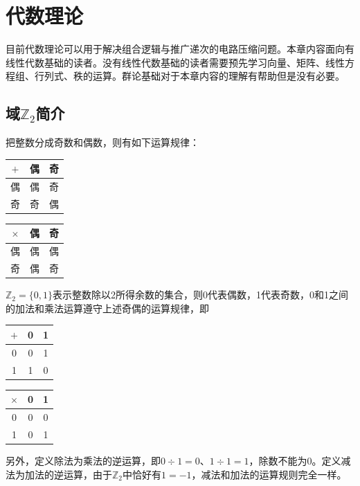 \chapter{代数理论}

目前代数理论可以用于解决组合逻辑与推广递次的电路压缩问题。本章内容面向有线性代数基础的读者。没有线性代数基础的读者需要预先学习向量、矩阵、线性方程组、行列式、秩的运算。群论基础对于本章内容的理解有帮助但是没有必要。

\section{域\texorpdfstring{$\mathbb{Z}_2$}{Z\_2}简介}
把整数分成奇数和偶数，则有如下运算规律：
\begin{center}
  \begin{tabular}{|c|cc|}
    \hline
    $+$ & 偶 & 奇 \\\hline
    偶  & 偶 & 奇 \\
    奇  & 奇 & 偶 \\\hline
  \end{tabular}
  \begin{tabular}{|c|cc|}
    \hline
    $\times$ & 偶 & 奇 \\\hline
    偶       & 偶 & 偶 \\
    奇       & 偶 & 奇 \\\hline
  \end{tabular}
\end{center}

$\mathbb{Z}_2=\{0,1\}$表示整数除以2所得余数的集合，则0代表偶数，1代表奇数，0和1之间的加法和乘法运算遵守上述奇偶的运算规律，即
\begin{center}
  \begin{tabular}{|c|cc|}
    \hline
    $+$ & 0 & 1 \\\hline
    0   & 0 & 1 \\
    1   & 1 & 0 \\\hline
  \end{tabular}
  \begin{tabular}{|c|cc|}
    \hline
    $\times$ & 0 & 1 \\\hline
    0        & 0 & 0 \\
    1        & 0 & 1 \\\hline
  \end{tabular}
\end{center}

另外，定义除法为乘法的逆运算，即$0\div 1=0$、$1\div 1=1$，除数不能为0。定义减法为加法的逆运算，由于$\mathbb{Z}_2$中恰好有$1=-1$，减法和加法的运算规则完全一样。


